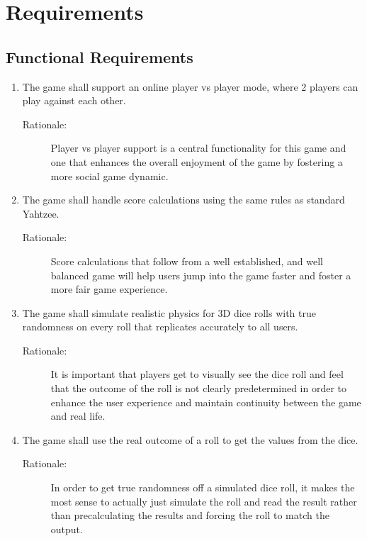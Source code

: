 \section{Requirements}

\subsection{Functional Requirements}

\begin{enumerate}[label=R\arabic*, start=1, left=0pt]

    \item The game shall support an online player vs player mode, where 2 players can play against each other.
    \begin{description}
        \item[Rationale:] Player vs player support is a central functionality for this game and one that enhances the overall enjoyment of the game by fostering a more social game dynamic.
    \end{description}

    \item The game shall handle score calculations using the same rules as standard Yahtzee.
    \begin{description}
        \item[Rationale:] Score calculations that follow from a well established, and well balanced game will help users jump into the game faster and foster a more fair game experience.
    \end{description}

    \item The game shall simulate realistic physics for 3D dice rolls with true randomness on every roll that replicates accurately to all users.
    \begin{description}
        \item[Rationale:] It is important that players get to visually see the dice roll and feel that the outcome of the roll is not clearly predetermined in order to enhance the user experience and maintain continuity between the game and real life.
    \end{description}

    \item The game shall use the real outcome of a roll to get the values from the dice.
    \begin{description}
        \item[Rationale:] In order to get true randomness off a simulated dice roll, it makes the most sense to actually just simulate the roll and read the result rather than precalculating the results and forcing the roll to match the output.
    \end{description}


\end{enumerate}
